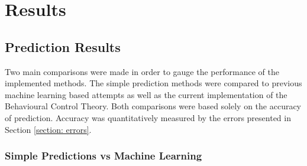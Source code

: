 \chapter{Results}
\label{chapter: Results}



\section{Prediction Results}
Two main comparisons were made in order to gauge the performance of the implemented methods. The simple prediction methods were compared to previous machine learning based attempts as well as the current implementation of the Behavioural Control Theory. Both comparisons were based solely on the accuracy of prediction. Accuracy was quantitatively measured by the errors presented in Section \ref{section: errors}.

\subsection{Simple Predictions vs Machine Learning}

